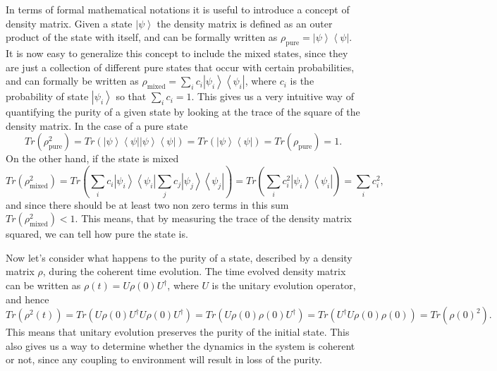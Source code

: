 In terms of formal mathematical notations it is useful to introduce a concept of density matrix. Given a state $\left|\psi \right>$ the density matrix is defined as an outer product of the state with itself, and can be formally written as $\rho_{\mathrm{pure}} = \left|\psi \right> \left< \psi \right|$. It is now easy to generalize this concept to include the mixed states, since they are just a collection of different pure states that occur  with certain probabilities, and can formally be written as $\rho_{\mathrm{mixed}} = \sum_{i} c_{i}\left|\psi_{i} \right> \left< \psi_{i} \right|$, where $c_{i}$ is the probability of state $\left|\psi_{i} \right>$ so that $\sum_{i}c_{i}=1$. This gives us a very intuitive way of quantifying the purity of a given state by looking at the trace of the square of the density matrix. In the case of a pure state 
\begin{equation}
Tr(\rho_{\mathrm{pure}}^2) = Tr(\left|\psi \right> \left< \psi \right| \left|\psi \right> \left< \psi \right|) = Tr(\left|\psi \right> \left< \psi \right|) = Tr(\rho_{\mathrm{pure}})=1.
\end{equation}
On the other hand, if the state is mixed
\begin{equation}
Tr(\rho_{\mathrm{mixed}}^2) = Tr(\sum_{i} c_{i}\left|\psi_{i} \right> \left< \psi_{i} \right| \sum_{j} c_{j}\left|\psi_{j} \right> \left< \psi_{j} \right|) = Tr(\sum_{i} c^2_{i}\left|\psi_{i} \right> \left< \psi_{i} \right|) = \sum_{i} c^2_{i},
\end{equation}
and since there should be at least two non zero terms in this sum $Tr(\rho_{\mathrm{mixed}}^2) <1$. This means, that by measuring the trace of the density matrix squared, we can tell how pure the state is. 

Now let's consider what happens to the purity of a state, described by a density matrix $\rho$, during the coherent time evolution. The time evolved density matrix can be written as $\rho(t) = U\rho(0) U^{\dagger}$, where $U$ is the unitary evolution operator, and hence 
\begin{equation}
Tr(\rho^2(t)) = Tr(U\rho(0) U^{\dagger} U\rho(0) U^{\dagger}) = Tr(U\rho(0) \rho(0) U^{\dagger}) = Tr(U^{\dagger} U\rho(0) \rho(0))  = Tr(\rho(0)^2). 
\end{equation}
This means that unitary evolution preserves the purity of the initial state. This also gives us a way to determine whether the dynamics in the system is coherent or not, since any coupling to environment will result in loss of the purity. 

